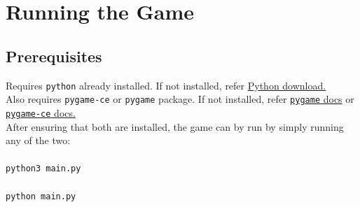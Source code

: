 \documentclass{article}
\begin{document}
\section{Running the Game}\label{sec:running}
\subsection{Prerequisites}\label{subsec:prereq}
Requires \texttt{python} already installed. If not installed, refer \href{https://www.python.org/downloads/}{Python download.}\\
Also requires \texttt{pygame-ce} or \texttt{pygame} package. If not installed, refer \href{https://www.pygame.org/wiki/GettingStarted}{\texttt{pygame} docs} or \href{https://pypi.org/project/pygame-ce/}{\texttt{pygame-ce} docs.}\\
After ensuring that both are installed, the game can by run by simply running any of the two:\\ \\
\texttt{python3 main.py}\\ \\
\texttt{python main.py}
\end{document}
